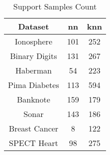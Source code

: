 \begin{table}[htbp]
\caption{Support Samples Count}
\begin{center}
\begin{tabular}{|c|c|c|}
\hline
\textbf{Dataset} & \textbf{nn} & \textbf{knn} \\ \hline
Ionosphere & 101 & 252 \\ \hline
Binary Digits & 131 & 267 \\ \hline
Haberman & 54 & 223 \\ \hline
Pima Diabetes & 113 & 594 \\ \hline
Banknote & 159 & 179 \\ \hline
Sonar & 143 & 186 \\ \hline
Breast Cancer & 8 & 122 \\ \hline
SPECT Heart & 98 & 275 \\ \hline
\end{tabular}
\label{tab:support}
\end{center}
\end{table}